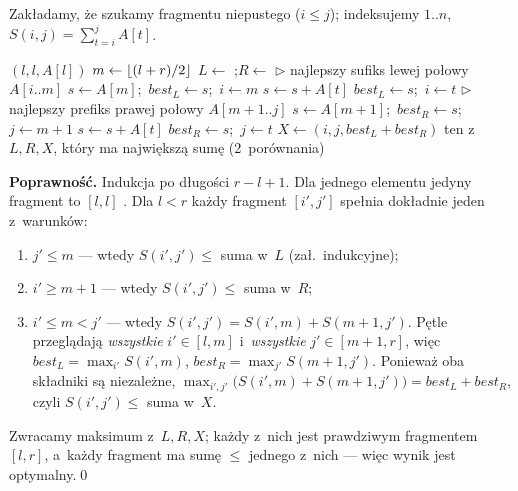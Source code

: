 \documentclass[11pt]{article}
\begin{document}
Zakładamy, że szukamy fragmentu niepustego ($i\le j$); indeksujemy $1..n$,
$S(i,j)=\sum_{t=i}^jA[t]$.

\begin{algorithm}[H]
\caption{\textsc{MaxFrag}$(A,l,r)$ --- zwraca $(i,j,S(i,j))$ maksymalne dla $l\le i\le j\le r$}
\begin{algorithmic}[1]
 \Return $(l,l,A[l])$ \EndIf
\State $m\gets\left\lfloor (l+r)/2 \right\rfloor$
\State $L\gets$ ;\quad $R\gets$ 
\Statex \(\triangleright\) najlepszy sufiks lewej połowy $A[i..m]$
\State $s\gets A[m]$;\ $\mathit{best}_L\gets s$;\ $i\gets m$
  \State $s\gets s+A[t]$
   $\mathit{best}_L\gets s$;\ $i\gets t$ \EndIf
\EndFor
\Statex \(\triangleright\) najlepszy prefiks prawej połowy $A[m{+}1..j]$
\State $s\gets A[m+1]$;\ $\mathit{best}_R\gets s$;\ $j\gets m+1$
  \State $s\gets s+A[t]$
   $\mathit{best}_R\gets s$;\ $j\gets t$ \EndIf
\EndFor
\State $X\gets(i,j,\mathit{best}_L+\mathit{best}_R)$
\State \Return ten z~$L,R,X$, który ma największą sumę (2~porównania)
\end{algorithmic}
\end{algorithm}

\textbf{Poprawność.} Indukcja po długości $r-l+1$. Dla jednego elementu
jedyny fragment to $[l,l]$ \checkmark. Dla $l<r$ każdy fragment $[i',j']$
spełnia dokładnie jeden z~warunków:
\begin{enumerate}
\item $j'\le m$ --- wtedy $S(i',j')\le$ suma w~$L$ (zał.\ indukcyjne);
\item $i'\ge m+1$ --- wtedy $S(i',j')\le$ suma w~$R$;
\item $i'\le m<j'$ --- wtedy $S(i',j')=S(i',m)+S(m+1,j')$. Pętle przeglądają
\emph{wszystkie} $i'\in[l,m]$ i~\emph{wszystkie} $j'\in[m+1,r]$, więc
$\mathit{best}_L=\max_{i'}S(i',m)$, $\mathit{best}_R=\max_{j'}S(m+1,j')$.
Ponieważ oba składniki są niezależne,
$\max_{i',j'}\bigl(S(i',m)+S(m+1,j')\bigr)=\mathit{best}_L+\mathit{best}_R$,
czyli $S(i',j')\le$ suma w~$X$.
\end{enumerate}
Zwracamy maksimum z~$L,R,X$; każdy z~nich jest prawdziwym fragmentem
$[l,r]$, a~każdy fragment ma sumę $\le$ jednego z~nich --- więc wynik jest
optymalny.\qed
\end{document}
